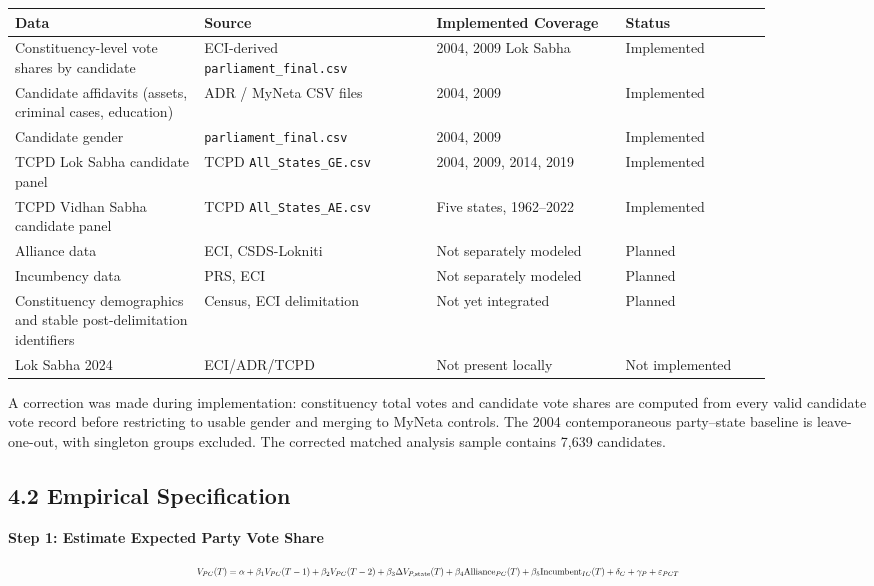 \documentclass[
]{article}
\newcounter{none} %
\begin{document}
{\def\LTcaptype{none} %
\begin{longtable}[]{@{}p{0.22\linewidth}p{0.27\linewidth}p{0.22\linewidth}p{0.17\linewidth}@{}}
\toprule\noalign{}
Data & Source & Implemented Coverage & Status \\
\midrule\noalign{}
\endhead
\bottomrule\noalign{}
\endlastfoot
Constituency-level vote shares by candidate & ECI-derived \texttt{parliament\_final.csv} & 2004, 2009 Lok Sabha & Implemented \\
Candidate affidavits (assets, criminal cases, education) & ADR / MyNeta CSV files & 2004, 2009 & Implemented \\
Candidate gender & \texttt{parliament\_final.csv} & 2004, 2009 & Implemented \\
TCPD Lok Sabha candidate panel & TCPD \texttt{All\_States\_GE.csv} & 2004, 2009, 2014, 2019 & Implemented \\
TCPD Vidhan Sabha candidate panel & TCPD \texttt{All\_States\_AE.csv} & Five states, 1962--2022 & Implemented \\
Alliance data & ECI, CSDS-Lokniti & Not separately modeled & Planned \\
Incumbency data & PRS, ECI & Not separately modeled & Planned \\
Constituency demographics and stable post-delimitation identifiers & Census, ECI delimitation & Not yet integrated & Planned \\
Lok Sabha 2024 & ECI/ADR/TCPD & Not present locally & Not implemented \\
\end{longtable}
}

A correction was made during implementation: constituency total votes and candidate vote shares are computed from every valid candidate vote record before restricting to usable gender and merging to MyNeta controls. The 2004 contemporaneous party--state baseline is leave-one-out, with singleton groups excluded. The corrected matched analysis sample contains 7,639 candidates.

\subsection{4.2 Empirical Specification}\label{42-empirical-specification}

\textbf{Step 1: Estimate Expected Party Vote Share}

\[\resizebox{\textwidth}{!}{$V_{PC}(T) = \alpha + \beta_1 V_{PC}(T-1) + \beta_2 V_{PC}(T-2) + \beta_3 \Delta V_{P,\text{state}}(T) + \beta_4 \text{Alliance}_{PC}(T) + \beta_5 \text{Incumbent}_{IC}(T) + \delta_C + \gamma_P + \varepsilon_{PCT}$}\]
\end{document}
